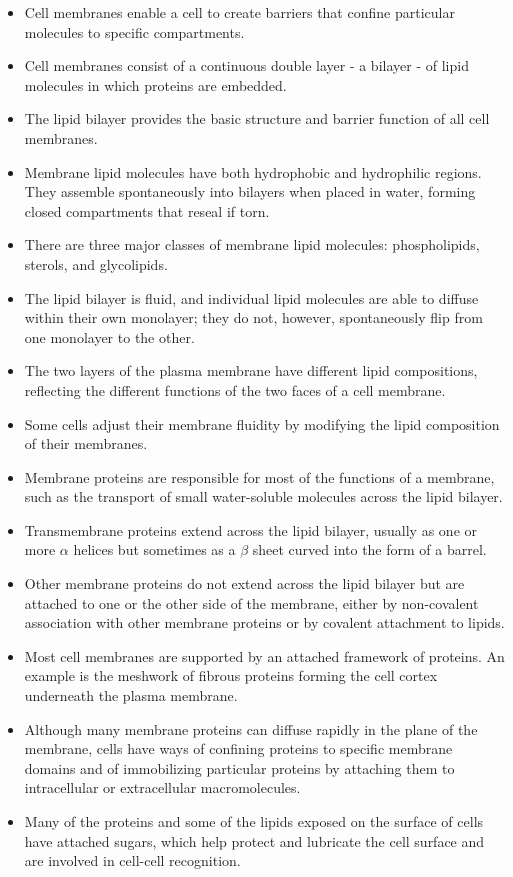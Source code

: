 \begin{itemize}
\item Cell membranes enable a cell to create barriers that confine particular
molecules to specific compartments.
\item Cell membranes consist of a continuous double layer - a bilayer - of
lipid molecules in which proteins are embedded.
\item The lipid bilayer provides the basic structure and barrier function of
all cell membranes.
\item Membrane lipid molecules have both hydrophobic and hydrophilic
regions. They assemble spontaneously into bilayers when placed in
water, forming closed compartments that reseal if torn.
\item There are three major classes of membrane lipid molecules: phospholipids,
sterols, and glycolipids.
\item The lipid bilayer is fluid, and individual lipid molecules are able to
diffuse within their own monolayer; they do not, however, spontaneously
flip from one monolayer to the other.
\item The two layers of the plasma membrane have different lipid compositions,
reflecting the different functions of the two faces of a cell
membrane.
\item Some cells adjust their membrane fluidity by modifying the lipid composition
of their membranes.
\item Membrane proteins are responsible for most of the functions of a
membrane, such as the transport of small water-soluble molecules
across the lipid bilayer.
\item Transmembrane proteins extend across the lipid bilayer, usually as
one or more $\alpha$ helices but sometimes as a $\beta$ sheet curved into the
form of a barrel.
\item Other membrane proteins do not extend across the lipid bilayer but
are attached to one or the other side of the membrane, either by non-covalent
association with other membrane proteins or by covalent
attachment to lipids.
\item Most cell membranes are supported by an attached framework of
proteins. An example is the meshwork of fibrous proteins forming the
cell cortex underneath the plasma membrane.
\item Although many membrane proteins can diffuse rapidly in the plane of
the membrane, cells have ways of confining proteins to specific membrane
domains and of immobilizing particular proteins by attaching
them to intracellular or extracellular macromolecules.
\item Many of the proteins and some of the lipids exposed on the surface of
cells have attached sugars, which help protect and lubricate the cell
surface and are involved in cell-cell recognition.
\end{itemize}

